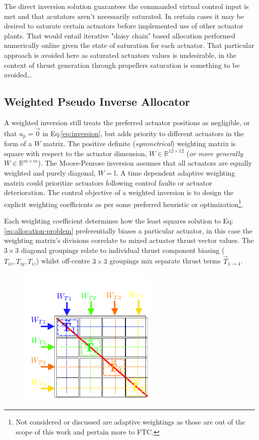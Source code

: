 {\par
The direct inversion solution guarantees the commanded virtual control input is met and that acutators aren't necessarily saturated. In certain cases it may be desired to saturate certain actuators before implemented use of other actuator plants. That would entail iterative "daisy chain"\cite{} based allocation performed numerically online given the state of saturation for each actuator. That particular approach is avoided here as saturated actuators values is undesirable, in the context of thrust generation through propellers saturation is something to be avoided\ldots
\subsection{Weighted Pseudo Inverse Allocator}
\label{subsec:control.allocation.weightedinverse}
A weighted inversion still treats the preferred actuator positions as negligible, or that $u_p=\vec{0}$ in Eq:\ref{eq:inversion}, but adds priority to different actuators in the form of a $W$ matrix. The positive definite (\emph{symmetrical}) weighting matrix is square with respect to the actuator dimension, $W\in\mathbb{R}^{12\times 12}$ (\emph{or more generally $W\in\mathbb{R}^{m\times m}$}). The Moore-Penrose inversion assumes that all actuators are equally weighted and purely diagonal, $W=\mathbb{I}$. A time dependent adaptive weighting matrix could prioritize actuators following control faults or actuator deterioration. The control objective of a weighted inversion is to design the explicit weighting coefficients as per some preferred heuristic or optimization\footnote{Not considered or discussed are adaptive weightings as those are out of the scope of this work and pertain more to FTC\cite{}.}.
\par
Each weighting coefficient determines how the least squares solution to Eq:\ref{eq:allocation-problem} preferentially biases a particular actuator, in this case the weighting matrix's divisions correlate to mixed actuator thrust vector values. The $3\times 3$ diagonal groupings relate to individual thrust component biasing ($T_{ix},T_{iy},T_{iz}$) whilst off-centre $3\times 3$ groupings mix separate thrust terms $\vec{T}_{1\rightarrow 4}$. 
\begin{figure}[htbp]
\centering
\includegraphics[width=0.6\textwidth]{figs/weighted-matrix}

\end{figure}}
